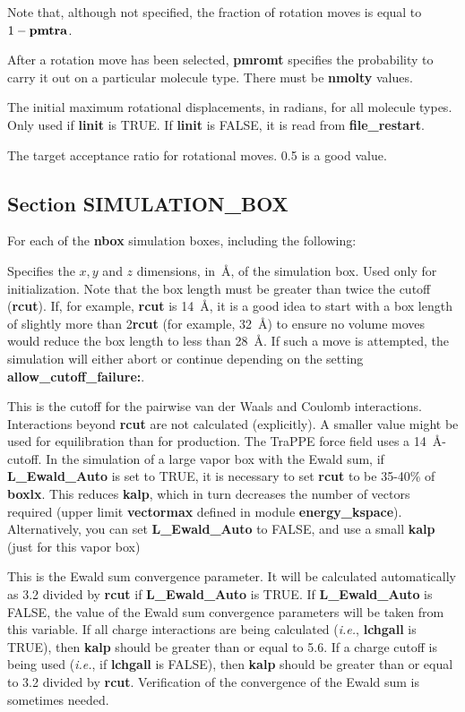 \documentclass[12pt,letterpaper]{article}
\begin{document}
Note that, although not specified, the fraction of rotation
moves is equal to $1 - {\bf pmtra}$.

 After a rotation move has been
selected, {\bf pmromt} specifies the probability to carry it
out on a particular molecule type. There must be {\bf
  nmolty} values.

 The initial maximum rotational
displacements, in radians, for all molecule types. Only used
if {\bf linit} is TRUE. If {\bf linit} is FALSE, it is read
from {\bf file\_restart}.

 The target acceptance ratio for
rotational moves. 0.5 is a good value.

\subsection{Section \textbf{SIMULATION\_BOX}}
For each of the \textbf{nbox} simulation boxes, including
the following:

 Specifies the $x, y$ and
$z$ dimensions, in~\AA, of the simulation box. Used only for
initialization. Note that the box length must be greater
than twice the cutoff ({\bf rcut}). If, for example, {\bf
  rcut} is 14~\AA, it is a good idea to start with a box
length of slightly more than 2{\bf rcut} (for example,
32~\AA) to ensure no volume moves would reduce the box
length to less than 28~\AA. If such a move is attempted, the
simulation will either abort or continue depending on the
setting {\bf allow\_cutoff\_failure:}.

 This is the cutoff for the pairwise van
der Waals and Coulomb interactions. Interactions beyond {\bf
  rcut} are not calculated (explicitly). A smaller value
might be used for equilibration than for production. The
TraPPE force field uses a 14~\AA-cutoff. In the simulation
of a large vapor box with the Ewald sum, if {\bf
  L\_Ewald\_Auto} is set to TRUE, it is necessary to set
{\bf rcut} to be 35-40\% of {\bf boxlx}. This reduces {\bf
  kalp}, which in turn decreases the number of vectors
required (upper limit {\bf vectormax} defined in module {\bf
  energy\_kspace}). Alternatively, you can set {\bf
  L\_Ewald\_Auto} to FALSE, and use a small {\bf kalp} (just
for this vapor box)

 This is the Ewald sum convergence
parameter. It will be calculated automatically as 3.2
divided by {\bf rcut} if {\bf L\_Ewald\_Auto} is TRUE. If
{\bf L\_Ewald\_Auto} is FALSE, the value of the Ewald sum
convergence parameters will be taken from this variable. If
all charge interactions are being calculated (\textit{i.e.},
{\bf lchgall} is TRUE), then {\bf kalp} should be greater
than or equal to 5.6. If a charge cutoff is being used
(\textit{i.e.}, if {\bf lchgall} is FALSE), then {\bf kalp}
should be greater than or equal to 3.2 divided by {\bf
  rcut}. Verification of the convergence of the Ewald sum is
sometimes needed.
\end{document}
